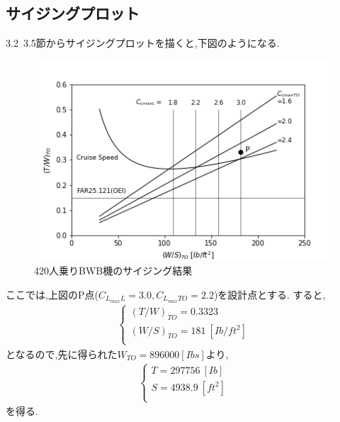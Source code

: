 \documentclass[../main]{subfiles}
\begin{document}
  \subsection{サイジングプロット}
  3.2~3.5節からサイジングプロットを描くと,下図のようになる.
  \begin{figure}[H]
    \begin{center}
      \includegraphics[width=12.0cm]{sizing.png}
      \caption{420人乗りBWB機のサイジング結果} %
      \label{sizing} %
    \end{center}
  \end{figure}
  ここでは,上図のP点($C_{L_{max}L} = 3.0 , C_{L_{max}TO} = 2.2$)を設計点とする.
  すると,
  \begin{eqnarray}
    \begin{cases}
      {(T/W)}_{TO} = 0.3323 \\
      {(W/S)}_{TO} = 181 \ [Ib/ft^2] \\
    \end{cases}
  \end{eqnarray}
  となるので,先に得られた$W_{TO} = 896000 [Ibs]$より,
  \begin{eqnarray}
    \begin{cases}
      T = 297756 \ [Ib]\\
      S = 4938.9 \ [ft^2] \\
    \end{cases}
  \end{eqnarray}
  を得る.
\end{document}
